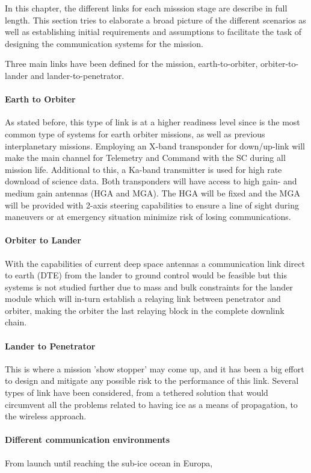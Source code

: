 
In this chapter, the different links for each misssion stage are describe in full length. This section tries to elaborate a broad picture of the different scenarios as well as establishing initial requirements and assumptions to facilitate the task of designing the communication systems for the mission.

Three main links have been defined for the mission, earth-to-orbiter, orbiter-to-lander and lander-to-penetrator.

\paragraph{Earth to Orbiter}
As stated before, this type of link is at a higher readiness level since is the most common type of systems for earth orbiter missions, as well as previous interplanetary missions. Employing an X-band transponder for down/up-link will make the main channel for Telemetry and Command with the SC during all mission life. Additional to this, a Ka-band transmitter is used for high rate download of science data. Both transponders will have access to high gain- and medium gain antennas (HGA and MGA). The HGA will be fixed and the MGA will be provided with 2-axis steering capabilities to ensure a line of sight during maneuvers or at emergency situation minimize risk of losing communications.

\paragraph{Orbiter to Lander}
With the capabilities of current deep space antennas a communication link direct to earth (DTE) from the lander to ground control would be feasible but this systems is not studied further due to mass and bulk constraints for the lander module which will in-turn establish a relaying link between penetrator and orbiter, making the orbiter the last relaying block in the complete downlink chain.

\paragraph{Lander to Penetrator}
This is where a mission 'show stopper' may come up, and it has been a big effort to design and mitigate any possible risk to the performance of this link. Several types of link have been considered, from a tethered solution that would circumvent all the problems related to having ice as a means of propagation, to the wireless approach.

\paragraph{Different communication environments}
From launch until reaching the sub-ice ocean in Europa,

